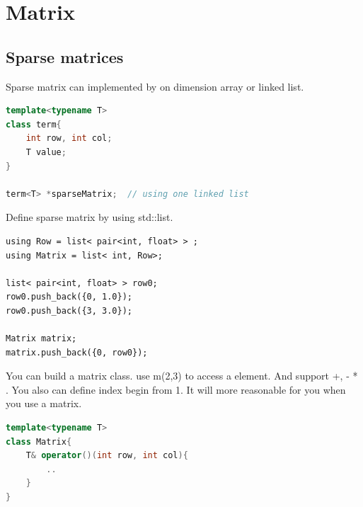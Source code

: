 \documentclass[a4paper,11pt,twoside]{book}
\begin{document}
\section{Matrix}
\subsection{Sparse matrices}

	\par Sparse matrix can implemented by on dimension array or linked list. 
\begin{lstlisting}[frame=single, language=c++]
template<typename T>
class term{
	int row, int col;
	T value;
}

term<T> *sparseMatrix;	// using one linked list
\end{lstlisting}

	\par Define sparse matrix by using std::list. 
\begin{lstlisting}
using Row = list< pair<int, float> > ;
using Matrix = list< int, Row>;

list< pair<int, float> > row0;
row0.push_back({0, 1.0});
row0.push_back({3, 3.0});

Matrix matrix;
matrix.push_back({0, row0});
\end{lstlisting}


%	
%	
%	
%	


	\par You can build a matrix class. use m(2,3) to access a element. And support +, - * . You also can define index begin from 1. It will more reasonable for you when you use a matrix. 
\begin{lstlisting}[frame=single, language=c++]
template<typename T>
class Matrix{
	T& operator()(int row, int col){
		..
	}
}	
\end{lstlisting} 
\end{document}
